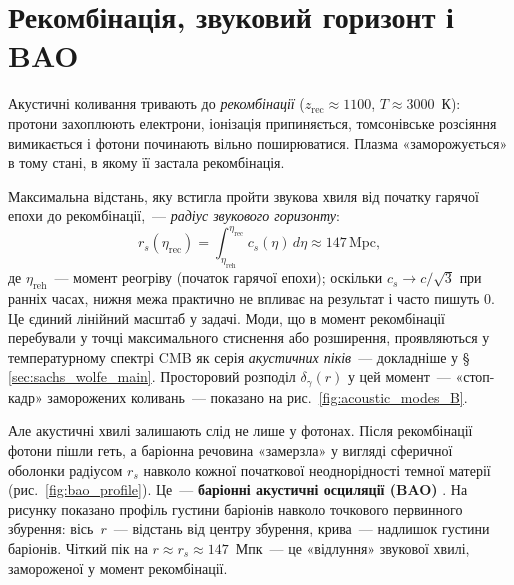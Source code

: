 
\section{Рекомбінація, звуковий горизонт і BAO}

Акустичні коливання тривають до \emph{рекомбінації}
($z_\mathrm{rec} \approx 1100$, $T \approx 3000$~К):
протони захоплюють електрони, іонізація припиняється,
томсонівське розсіяння вимикається і фотони починають
вільно поширюватися. Плазма «заморожується» в тому стані,
в якому її застала рекомбінація.

Максимальна відстань, яку встигла пройти звукова хвиля
від початку гарячої епохи до рекомбінації,~---
\emph{радіус звукового горизонту}:
\begin{equation}\label{eq:sound_horizon}
  r_s(\eta_\mathrm{rec})
    = \int_{\eta_\mathrm{reh}}^{\eta_\mathrm{rec}} c_s(\eta)\,d\eta
    \approx 147\,\mathrm{Mpc},
\end{equation}
де $\eta_\mathrm{reh}$~--- момент реогріву (початок гарячої
епохи); оскільки $c_s \to c/\sqrt{3}$ при ранніх часах,
нижня межа практично не впливає на результат і часто
пишуть $0$.
Це єдиний лінійний масштаб у задачі. Моди, що в момент
рекомбінації перебували у точці максимального стиснення
або розширення, проявляються у температурному спектрі
CMB як серія \emph{акустичних піків}~--- докладніше
у §\,\ref{sec:sachs_wolfe_main}.
Просторовий розподіл $\delta_\gamma(r)$ у цей момент~---
«стоп-кадр» заморожених коливань~--- показано на
рис.~\ref{fig:acoustic_modes_B}.

Але акустичні хвилі залишають слід не лише у фотонах.
Після рекомбінації фотони пішли геть, а баріонна речовина
«замерзла» у вигляді сферичної оболонки радіусом $r_s$
навколо кожної початкової неоднорідності темної матерії
(рис.~\ref{fig:bao_profile}). Це~--- \textbf{баріонні
акустичні осциляції (BAO)} \cite{eisenstein_2005}.
На рисунку показано профіль густини баріонів навколо
точкового первинного збурення: вісь~$r$~--- відстань
від центру збурення, крива~--- надлишок густини баріонів.
Чіткий пік на $r \approx r_s \approx 147$~Мпк~---
це «відлуння» звукової хвилі, замороженої у момент
рекомбінації.

